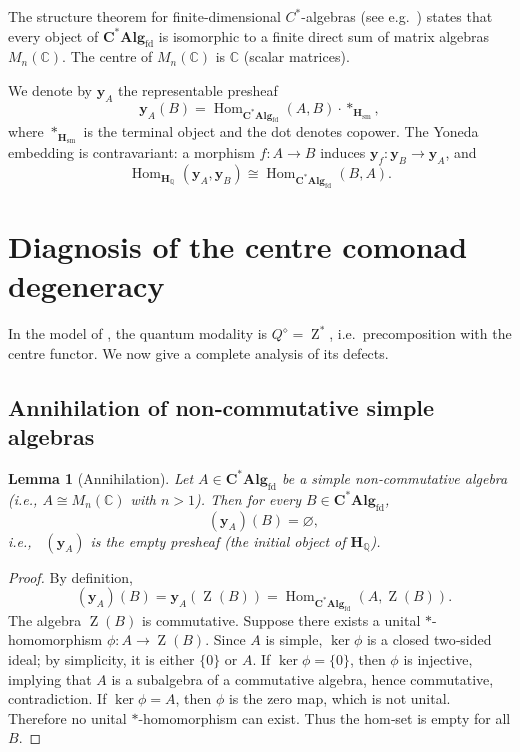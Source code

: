 \documentclass[12pt,a4paper]{article}
\theoremstyle{plain}
\newtheorem{lemma}[theorem]{Lemma}
\theoremstyle{definition}
\DeclareMathOperator{\Qpot}{Q^{\diamond}}
\DeclareMathOperator{\Center}{Z}
\DeclareMathOperator{\Hom}{Hom}
\newcommand{\Htopos}{\mathbf{H}_{\mathbb{Q}}}
\newcommand{\CAlgfd}{\mathbf{C}^{*}\mathbf{Alg}_{\mathrm{fd}}}
\begin{document}
The structure theorem for finite‑dimensional \(C^{*}\)-algebras (see e.g.\ \cite[Theorem I.11.2]{Takesaki}) states that every object of \(\CAlgfd\) is isomorphic to a finite direct sum of matrix algebras \(M_n(\mathbb{C})\).  The centre of \(M_n(\mathbb{C})\) is \(\mathbb{C}\) (scalar matrices).

We denote by \(\mathbf{y}_A\) the representable presheaf
\[
\mathbf{y}_A(B) = \Hom_{\CAlgfd}(A,B)\cdot *_{\mathbf{H}_{\mathrm{sm}}},
\]
where \(*_{\mathbf{H}_{\mathrm{sm}}}\) is the terminal object and the dot denotes copower.  The Yoneda embedding is contravariant: a morphism \(f:A\to B\) induces \(\mathbf{y}_f : \mathbf{y}_B \to \mathbf{y}_A\), and
\[
\Hom_{\Htopos}(\mathbf{y}_A,\mathbf{y}_B) \cong \Hom_{\CAlgfd}(B,A).
\tag{1}
\]

\section{Diagnosis of the centre comonad degeneracy}
\label{sec:degeneracy}

In the model of \cite{Woo2026}, the quantum modality is \(Q^{\diamond} = \Center^{*}\), i.e.\ precomposition with the centre functor.  We now give a complete analysis of its defects.

\subsection{Annihilation of non‑commutative simple algebras}
\label{sec:annihilation}

\begin{lemma}[Annihilation]\label{lem:annihilation}
Let \(A\in\CAlgfd\) be a simple non‑commutative algebra (i.e., \(A \cong M_n(\mathbb{C})\) with \(n>1\)).  Then for every \(B\in\CAlgfd\),
\[
\Qpot(\mathbf{y}_A)(B) = \varnothing,
\]
i.e., \(\Qpot(\mathbf{y}_A)\) is the empty presheaf (the initial object of \(\Htopos\)).
\end{lemma}

\begin{proof}
By definition,
\[
\Qpot(\mathbf{y}_A)(B) = \mathbf{y}_A(\Center(B)) = \Hom_{\CAlgfd}(A,\Center(B)).
\]
The algebra \(\Center(B)\) is commutative.  Suppose there exists a unital \(*\)-homomorphism \(\phi : A \to \Center(B)\).  Since \(A\) is simple, \(\ker\phi\) is a closed two‑sided ideal; by simplicity, it is either \(\{0\}\) or \(A\).  If \(\ker\phi=\{0\}\), then \(\phi\) is injective, implying that \(A\) is a subalgebra of a commutative algebra, hence commutative, contradiction.  If \(\ker\phi = A\), then \(\phi\) is the zero map, which is not unital.  Therefore no unital \(*\)-homomorphism can exist.  Thus the hom‑set is empty for all \(B\). \qedhere
\end{proof}
\end{document}
